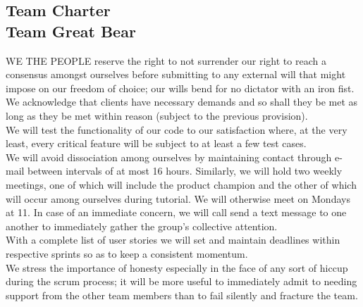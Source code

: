 \documentclass{report}
\begin{document}
\begin{center}
\section*{Team Charter\\Team Great Bear\\}
\end{center}
{\Huge WE THE PEOPLE} reserve the right to not surrender our right to reach a consensus amongst ourselves before submitting to any external will that might impose on our freedom of choice; our wills bend for no dictator with an iron fist.\\

\noindent  We acknowledge that clients have necessary demands and so shall they be met as long as they be met within reason (subject to the previous provision).\\ 

\noindent We will test the functionality of our code to our satisfaction where, at the very least, every critical feature will be subject to at least a few test cases.\\

\noindent We will avoid dissociation among ourselves by maintaining contact through e-mail between intervals of at most 16 hours. Similarly, we will hold two weekly meetings, one of which will include the product champion and the other of which will occur among ourselves during tutorial. We will otherwise meet on Mondays at 11. In case of an immediate concern, we will call send a text message to one another to immediately gather the group's collective attention.\\

\noindent With a complete list of user stories we will set and maintain deadlines within respective sprints so as to keep a consistent momentum.\\

\noindent We stress the importance of honesty especially in the face of any sort of hiccup during the scrum process; it will be more useful to immediately admit to needing support from the other team members than to fail silently and fracture the team.\\
\end{document}
